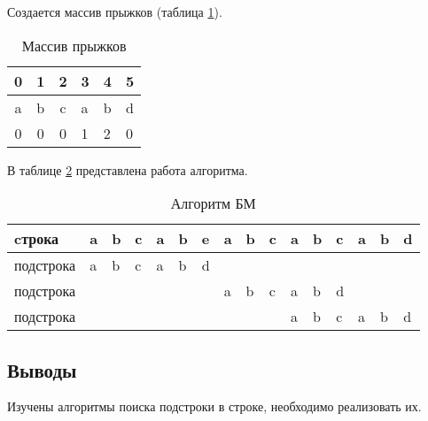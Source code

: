 Создается массив прыжков (таблица \ref{table:example2}).

\begin{table}[H]
    \centering
    \caption{Массив прыжков}
    \label{table:example2}
    \begin{tabular}{|c|c|c|l|l|l|}
    \hline
    0 & 1 & 2 & 3 & 4 & 5 \\ \hline
    a & b & c & a & b & d \\ \hline
    0 & 0 & 0 & 1 & 2 & 0 \\ \hline
    \end{tabular}
\end{table}

В таблице \ref{table:bm} представлена работа алгоритма.

\begin{table}[H]
    \centering
    \caption{Алгоритм БМ}
    \label{table:bm}
    \begin{tabular}{|l|l|l|l|l|l|l|l|l|l|l|l|l|l|l|l|}
    \hline
    cтрока & a & b & c & a & b & e & a & b & c & a & b & c & a & b & d \\
    \hline
    подстрока & a & b & c & a & b & \cellcolor[HTML]{FE0000}d & & & & & & & & & \\
    \hline
    подстрока & & & & & & & a & b & c & a & b & \cellcolor[HTML]{FE0000}d & & & \\
    \hline
    подстрока & & & & & & & & & & \cellcolor[HTML]{34FF34}a & \cellcolor[HTML]{34FF34}b & \cellcolor[HTML]{34FF34}c & \cellcolor[HTML]{34FF34}a & \cellcolor[HTML]{34FF34}b & \cellcolor[HTML]{34FF34}d \\
    \hline
    \end{tabular}
\end{table}

\subsection{Выводы}

Изучены алгоритмы поиска подстроки в строке, необходимо реализовать их.

